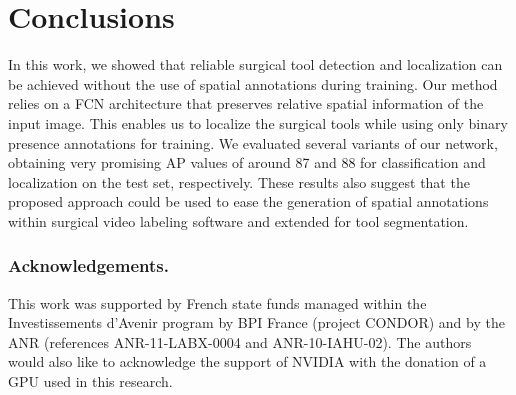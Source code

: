 \documentclass[english,runningheads,a4paper]{llncs}
\begin{document}
\section{Conclusions}
In this work, we showed that reliable surgical tool detection and localization can be achieved without the use of spatial annotations during training. Our method relies on a FCN architecture that preserves relative spatial information of the input image. This enables us to localize the surgical tools while using only binary presence annotations for training. We evaluated several variants of our network, obtaining very promising AP values of around 87 and 88 for classification and localization on the test set, respectively. 
These results also suggest that the proposed approach could be used to ease the generation of spatial annotations within surgical video labeling software and extended for tool segmentation.

\subsubsection{Acknowledgements.}
This work was supported by French state funds managed within the Investissements d'Avenir program by BPI France (project CONDOR) and by the ANR (references ANR-11-LABX-0004 and ANR-10-IAHU-02). The authors would also like to acknowledge the support of NVIDIA with the donation of a GPU used in this research.



\end{document}
